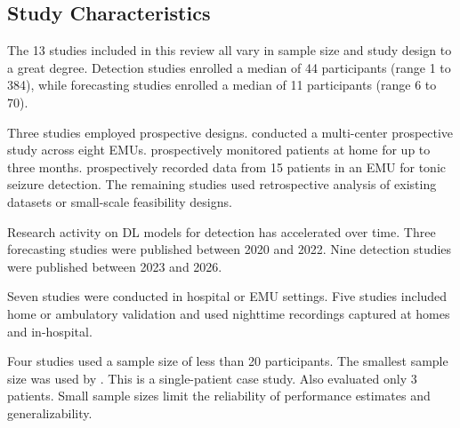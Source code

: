 \subsection{Study Characteristics}
\label{sec:study-characteristics}

The 13 studies included in this review all vary in sample size and study design to a great degree. Detection studies enrolled a median of 44 participants (range 1 to 384), while forecasting studies enrolled a median of 11 participants (range 6 to 70).

Three studies employed prospective designs. \textcite{spahrDeepLearningbasedDetection2025} conducted a multi-center prospective study across eight EMUs. \textcite{dongTwoLayerEnsembleMethod2022} prospectively monitored patients at home for up to three months. \textcite{fineDetectionKeyAutomated2025} prospectively recorded data from 15 patients in an EMU for tonic seizure detection. The remaining studies used retrospective analysis of existing datasets or small-scale feasibility designs.

Research activity on DL models for detection has accelerated over time. Three forecasting studies were published between 2020 and 2022. Nine detection studies were published between 2023 and 2026. 

Seven studies were conducted in hospital or EMU settings. Five studies included home or ambulatory validation and \textcite{elemamAutomatedValidatedTool2025} used nighttime recordings captured at homes and in-hospital.

Four studies used a sample size of less than 20 participants. The smallest sample size was used by \textcite{singhrathoreDevelopmentMultimodalMachine2024}. This is  a single-patient case study. Also \textcite{borujenyDetectionEpilepticSeizure2013} evaluated only 3 patients. Small sample sizes limit the reliability of performance estimates and generalizability.
